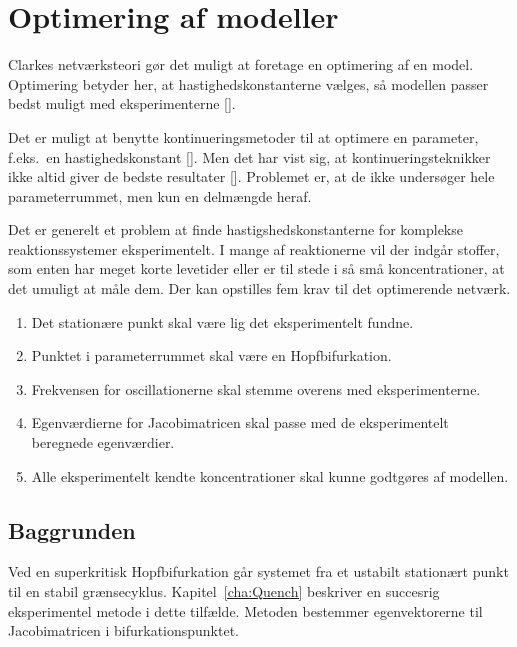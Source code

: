 \section{Optimering af modeller}
Clarkes netv{\ae}rksteori g{\o}r det muligt at foretage en
optimering af en model. Optimering betyder her, at
hastighedskonstanterne v{\ae}lges, s{\aa} modellen passer
bedst muligt med eksperimenterne
[].

\vspace{4.0mm}
Det er muligt at benytte kontinueringsmetoder til at
optimere en parameter, f.eks.\ en hastighedskonstant
[]. Men det har vist sig, at
kontinueringsteknikker ikke altid giver de bedste
resultater []. Problemet er, at de ikke
unders{\o}ger hele parameterrummet, men kun en delm{\ae}ngde
heraf.

\vspace{4.0mm}
Det er generelt et problem at finde hastigshedskonstanterne
for komplekse reaktionssystemer eksperimentelt. I mange af
reaktionerne vil der indg{\aa}r stoffer, som enten har
meget korte levetider eller er til stede i s{\aa} sm{\aa}
koncentrationer, at det umuligt at m{\aa}le dem. Der kan
opstilles fem krav til det optimerende netv{\ae}rk.

\begin{enumerate}
  \item
    Det station{\ae}re punkt skal v{\ae}re lig det eksperimentelt fundne.
  \item
    Punktet i parameterrummet skal v{\ae}re en Hopfbifurkation.
  \item
    Frekvensen for oscillationerne skal stemme overens med
    eksperimenterne.
  \item
    Egenv{\ae}rdierne for Jacobimatricen skal passe med de eksperimentelt
    beregnede egenv{\ae}rdier.
  \item
    Alle eksperimentelt kendte koncentrationer skal kunne
    godtg{\o}res af modellen.
\end{enumerate}

\subsection{Baggrunden}
Ved en superkritisk Hopfbifurkation g{\aa}r systemet fra et
ustabilt station{\ae}rt punkt til en stabil
gr{\ae}nsecyklus. Kapitel~\ref{cha:Quench} beskriver en
succesrig eksperimentel metode i dette tilf{\ae}lde.
Metoden bestemmer egenvektorerne til Jacobimatricen i
bifurkationspunktet.

